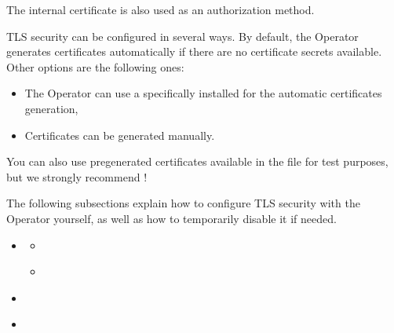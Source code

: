\documentclass[letterpaper,10pt,english]{sphinxmanual}
\begin{document}
The internal certificate is also used as an authorization method.

TLS security can be configured in several ways. By default, the Operator
generates certificates automatically if there are no certificate secrets
available. Other options are the following ones:
\begin{itemize}
\item {} 
The Operator can use a specifically installed  for the automatic
certificates generation,

\item {} 
Certificates can be generated manually.

\end{itemize}

You can also use pre\sphinxhyphen{}generated certificates available in the
 file for test purposes, but we strongly recommend
!

The following subsections explain how to configure TLS security with the
Operator yourself, as well as how to temporarily disable it if needed.

\begin{sphinxShadowBox}
\begin{itemize}
\item {} 
\label{\detokenize{TLS:id1}}{\hyperref[\detokenize{TLS:install-and-use-the-cert-manager}]{}}
\begin{itemize}
\item {} 
\label{\detokenize{TLS:id2}}{\hyperref[\detokenize{TLS:about-the-cert-manager}]{}}

\item {} 
\label{\detokenize{TLS:id3}}{\hyperref[\detokenize{TLS:installation-of-the-cert-manager}]{}}

\end{itemize}

\item {} 
\label{\detokenize{TLS:id4}}{\hyperref[\detokenize{TLS:generate-certificates-manually}]{}}

\item {} 
\label{\detokenize{TLS:id5}}{\hyperref[\detokenize{TLS:run-psmdb-without-tls}]{}}

\end{itemize}
\end{sphinxShadowBox}
\end{document}
